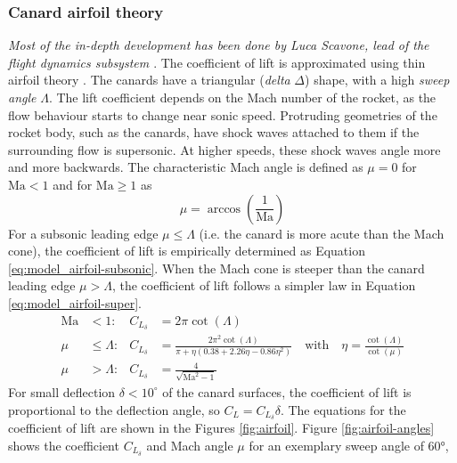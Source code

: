 \subsubsection{Canard airfoil theory}
\textit{Most of the in-depth development has been done by Luca Scavone, lead of the flight dynamics subsystem \cite{team-flight-luca}}.
The coefficient of lift is approximated using thin airfoil theory \cite{stengel2004}.
The canards have a triangular (\textit{delta} $\Delta$) shape, with a high \textit{sweep angle} $\Lambda$. 
The lift coefficient depends on the Mach number of the rocket, as the flow behaviour starts to change near sonic speed.
Protruding geometries of the rocket body, such as the canards, have shock waves attached to them if the surrounding flow is supersonic.
At higher speeds, these shock waves angle more and more backwards. 
The characteristic Mach angle is defined as $\mu = 0$ for $\mathrm{Ma} < 1$ and for $\mathrm{Ma} \geq 1$ as \cite{stengel2004}
\begin{equation}
    \mu = \arccos(\frac{1}{\mathrm{Ma}})
\end{equation}
For a subsonic leading edge $\mu \leq \Lambda$ (i.e. the canard is more acute than the Mach cone), the coefficient of lift is empirically determined \cite{stengel2004} as Equation \ref{eq:model_airfoil-subsonic}.
When the Mach cone is steeper than the canard leading edge $\mu > \Lambda$, the coefficient of lift follows a simpler law \cite{stengel2004} in Equation \ref{eq:model_airfoil-super}.
\begin{align}
    \mathrm{Ma} &<  1: & C_{L_\delta} &= 2 \pi\cot(\Lambda)
    \\
    \mu &\leq \Lambda : & C_{L_\delta} &= \frac{2 \pi^2 \cot(\Lambda)}{\pi + \eta (0.38 + 2.26 \eta - 0.86 \eta^2)} \quad \text{with} \quad \eta = \frac{\cot(\Lambda)}{\cot(\mu)} \label{eq:model_airfoil-subsonic} 
    \\
    \mu &> \Lambda : &C_{L_\delta} &= \frac{4}{\sqrt{\mathrm{Ma}^2-1}} \label{eq:model_airfoil-super}
\end{align}
For small deflection $\delta < 10^\circ$ of the canard surfaces, the coefficient of lift is proportional to the deflection angle, so $C_L = C_{L_\delta} \delta$.
The equations for the coefficient of lift are shown in the Figures \ref{fig:airfoil}.
Figure \ref{fig:airfoil-angles} shows the coefficient $C_{L_\delta}$ and Mach angle $\mu$ for an exemplary sweep angle of 60°, 

